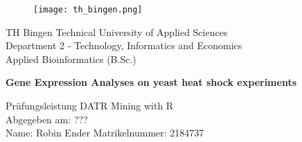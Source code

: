 \begin{titlepage}

	\begin{figure}
	\texttt{[image: th\_bingen.png]}
	\end{figure}
	
	\begin{center}
	\large
	TH Bingen Technical University of Applied Sciences\\
    Department 2 - Technology, Informatics and Economics\\
    Applied Bioinformatics (B.Sc.)\\
    \vspace{0.5cm}
	
    \huge
    \textbf{Gene Expression Analyses on yeast heat
shock experiments} 
    \vfill
    
    \large
    Prüfungsleistung DATR Mining with R \\
    Abgegeben am: ???\\
    Name: Robin Ender
    Matrikelnummer: 2184737
    \vspace{0.5cm}
	\end{center}
	
\end{titlepage}

